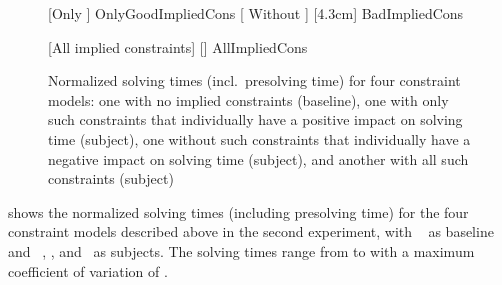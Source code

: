 \begin{figure}
  \centering%

                      [Only ]
                      {OnlyGoodImpliedCons}%
  \hfill%
                      [%
                        Without
                      ]%
                      [4.3cm]%
                      {BadImpliedCons}%

  \vspace{\betweensubfigures}

                      [All implied constraints]%
                      [\linewidth]%
                      {AllImpliedCons}%

  \caption[%
            Plot for evaluating the impact on solving time made by different
            combinations of implied constraints%
          ]%
          {%
            Normalized solving times (incl.\ presolving time) for four
            constraint models: one with no implied constraints (baseline), one
            with only such constraints that individually have a positive impact
            on solving time (subject), one without such constraints that
            individually have a negative impact on solving time (subject), and
            another with all such constraints (subject)%
          }
\end{figure}

 shows the normalized solving
times (including presolving time) for the four \glspl{constraint model}
described above in the second experiment, with ~\modelC{} as \gls{baseline} and ~\modelD,
\modelE, and~\modelF{} as \glspl{subject}.
%
The solving times range from
\printMinSolvingTime{
  \SolvTechEnableOnlyGoodImpliedConsPrePlusSolvingTimeSpeedupNonePrePlusSolvingTimeAvgMin,
  \SolvTechEnableOnlyGoodImpliedConsPrePlusSolvingTimeSpeedupPrePlusSolvingTimeAvgMin,
  \SolvTechDisableBadImpliedConsPrePlusSolvingTimeSpeedupPrePlusSolvingTimeAvgMin,
  \SolvTechDisableAllImpliedConsPrePlusSolvingTimeSpeedupPrePlusSolvingTimeAvgMin
} to
\printMaxSolvingTime{
  \SolvTechEnableOnlyGoodImpliedConsPrePlusSolvingTimeSpeedupNonePrePlusSolvingTimeAvgMax,
  \SolvTechEnableOnlyGoodImpliedConsPrePlusSolvingTimeSpeedupPrePlusSolvingTimeAvgMax,
  \SolvTechDisableBadImpliedConsPrePlusSolvingTimeSpeedupPrePlusSolvingTimeAvgMax,
  \SolvTechDisableAllImpliedConsPrePlusSolvingTimeSpeedupPrePlusSolvingTimeAvgMax
} with a maximum coefficient of variation of
\numMaxOf{
  \SolvTechEnableOnlyGoodImpliedConsPrePlusSolvingTimeSpeedupNonePrePlusSolvingTimeCvMax,
  \SolvTechEnableOnlyGoodImpliedConsPrePlusSolvingTimeSpeedupPrePlusSolvingTimeCvMax,
  \SolvTechDisableBadImpliedConsPrePlusSolvingTimeSpeedupPrePlusSolvingTimeCvMax,
  \SolvTechDisableAllImpliedConsPrePlusSolvingTimeSpeedupPrePlusSolvingTimeCvMax
}.

